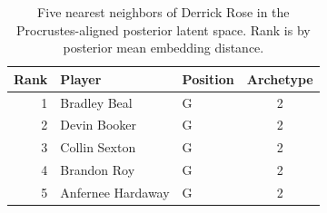 \begin{table}[htbp]
  \centering\small
  \begin{tabular}{rllc}
    \toprule
    Rank & Player & Position & Archetype \\
    \midrule
    1 & Bradley Beal & G & 2 \\
    2 & Devin Booker & G & 2 \\
    3 & Collin Sexton & G & 2 \\
    4 & Brandon Roy & G & 2 \\
    5 & Anfernee Hardaway & G & 2 \\
    \bottomrule
  \end{tabular}
  \caption{Five nearest neighbors of Derrick Rose in the Procrustes-aligned posterior latent space. Rank is by posterior mean embedding distance.}
  \label{tab:Derrick_Rose_neighbors}
\end{table}

